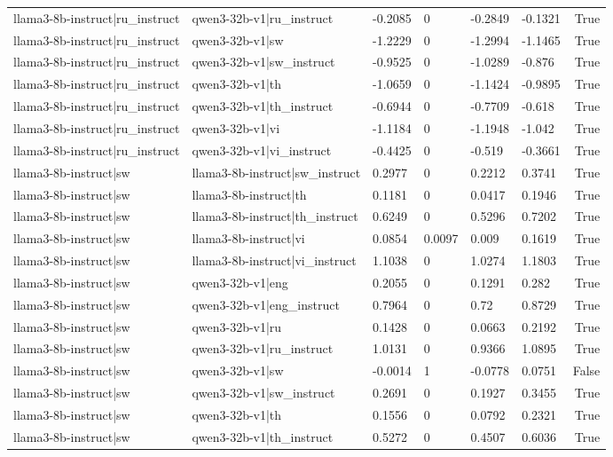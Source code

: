 \begin{table}
\begin{tabular}{llllllr}
llama3-8b-instruct|ru_instruct & qwen3-32b-v1|ru_instruct & -0.2085 & 0 & -0.2849 & -0.1321 & True \\
llama3-8b-instruct|ru_instruct & qwen3-32b-v1|sw & -1.2229 & 0 & -1.2994 & -1.1465 & True \\
llama3-8b-instruct|ru_instruct & qwen3-32b-v1|sw_instruct & -0.9525 & 0 & -1.0289 & -0.876 & True \\
llama3-8b-instruct|ru_instruct & qwen3-32b-v1|th & -1.0659 & 0 & -1.1424 & -0.9895 & True \\
llama3-8b-instruct|ru_instruct & qwen3-32b-v1|th_instruct & -0.6944 & 0 & -0.7709 & -0.618 & True \\
llama3-8b-instruct|ru_instruct & qwen3-32b-v1|vi & -1.1184 & 0 & -1.1948 & -1.042 & True \\
llama3-8b-instruct|ru_instruct & qwen3-32b-v1|vi_instruct & -0.4425 & 0 & -0.519 & -0.3661 & True \\
llama3-8b-instruct|sw & llama3-8b-instruct|sw_instruct & 0.2977 & 0 & 0.2212 & 0.3741 & True \\
llama3-8b-instruct|sw & llama3-8b-instruct|th & 0.1181 & 0 & 0.0417 & 0.1946 & True \\
llama3-8b-instruct|sw & llama3-8b-instruct|th_instruct & 0.6249 & 0 & 0.5296 & 0.7202 & True \\
llama3-8b-instruct|sw & llama3-8b-instruct|vi & 0.0854 & 0.0097 & 0.009 & 0.1619 & True \\
llama3-8b-instruct|sw & llama3-8b-instruct|vi_instruct & 1.1038 & 0 & 1.0274 & 1.1803 & True \\
llama3-8b-instruct|sw & qwen3-32b-v1|eng & 0.2055 & 0 & 0.1291 & 0.282 & True \\
llama3-8b-instruct|sw & qwen3-32b-v1|eng_instruct & 0.7964 & 0 & 0.72 & 0.8729 & True \\
llama3-8b-instruct|sw & qwen3-32b-v1|ru & 0.1428 & 0 & 0.0663 & 0.2192 & True \\
llama3-8b-instruct|sw & qwen3-32b-v1|ru_instruct & 1.0131 & 0 & 0.9366 & 1.0895 & True \\
llama3-8b-instruct|sw & qwen3-32b-v1|sw & -0.0014 & 1 & -0.0778 & 0.0751 & False \\
llama3-8b-instruct|sw & qwen3-32b-v1|sw_instruct & 0.2691 & 0 & 0.1927 & 0.3455 & True \\
llama3-8b-instruct|sw & qwen3-32b-v1|th & 0.1556 & 0 & 0.0792 & 0.2321 & True \\
llama3-8b-instruct|sw & qwen3-32b-v1|th_instruct & 0.5272 & 0 & 0.4507 & 0.6036 & True \\

\end{tabular}
\end{table}
